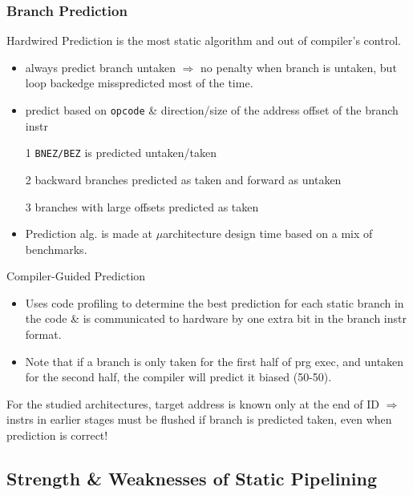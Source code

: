 \documentclass{beamer}
\newcommand{\emp}[1]{\textcolor{DikuRed}{ #1}}
\begin{document}
\begin{frame}[fragile,t]
\frametitle{Branch Prediction}

\emp{Hardwired Prediction} is the most static algorithm and out of compiler's control.\pause
\begin{scriptsize}
\begin{itemize}
\item always predict branch untaken $\Rightarrow$ no penalty when branch is untaken,
        but loop backedge misspredicted most of the time.\smallskip
\item predict based on {\tt opcode} \& direction/size of the address offset of the 
        branch instr
\item[1] {\tt BNEZ/BEZ} is predicted untaken/taken
\item[2] backward branches predicted as taken and forward as untaken
\item[3] branches with large offsets predicted as taken 
\item \emp{Prediction alg. is made at $\mu$architecture design time based on 
            a mix of benchmarks}.
\end{itemize}
\end{scriptsize}

\bigskip

\emp{Compiler-Guided Prediction}\pause
\begin{scriptsize}
\begin{itemize}
\item Uses code profiling to determine the best prediction
        for each static branch in the code \& is communicated to hardware 
        by one extra bit in the branch instr format.
\item Note that if a branch is only taken for the first half of prg exec,
        and untaken for the second half, the compiler will predict it biased (50-50). 
\end{itemize}
\end{scriptsize}

\bigskip

For the studied architectures, target address is known only at the end of ID $\Rightarrow$
instrs in earlier stages must be flushed if branch is predicted taken, even when 
prediction is correct!

\end{frame}

\subsection{Strength \& Weaknesses of Static Pipelining}
\end{document}
